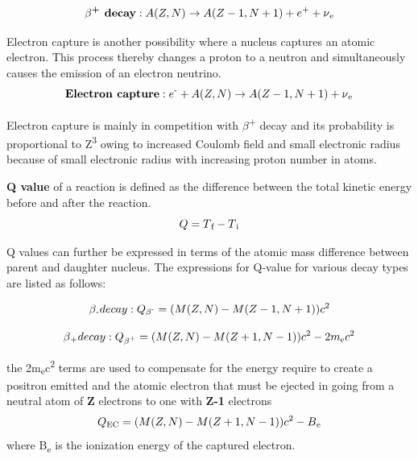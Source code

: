 \begin{equation}
\textbf{$\beta$\textsuperscript{+} decay}: A(Z,N) \to A(Z-1 , N+1) + e\textsuperscript{+} + {\nu}\textsubscript{e}
\end{equation}

Electron capture is another possibility where a nucleus captures an atomic electron. This process thereby changes a proton to a neutron and simultaneously causes the emission of an electron neutrino.
\begin{equation}
\textbf{Electron capture}:  e\textsuperscript{-} + A(Z,N) \to A(Z-1 , N+1) +{\nu}\textsubscript{e}
\end{equation}

Electron capture is mainly in competition with $\beta$\textsuperscript{+} decay and its probability is proportional to Z\textsuperscript{3} owing to increased Coulomb field and small electronic radius because of small electronic radius with increasing proton number in atoms.

\textbf{Q value} of a reaction is defined as the difference between the total kinetic energy before and after the reaction. 
\begin{equation}
Q = T\textsubscript{f} - T\textsubscript{i}
\end{equation}

Q values can further be expressed in terms of the atomic mass difference between parent and daughter nucleus. The expressions for Q-value for various decay types are listed as follows: 

\begin{equation}
\beta\textsubscript{-} decay:
Q\textsubscript{$\beta$\textsuperscript{-}} = (M(Z,N)  - M(Z-1,N+1))c\textsuperscript{2}  
\end{equation}

\begin{equation}
\beta\textsubscript{+} decay:
Q\textsubscript{$\beta$\textsuperscript{+}} = (M(Z,N)  - M(Z+1,N-1))c\textsuperscript{2} - 2m\textsubscript{e}c\textsuperscript{2}
\end{equation}

the 2m\textsubscript{e}c\textsuperscript{2} terms are used to compensate for the energy require to create a positron emitted and the atomic electron that must be ejected in going from a neutral atom of \textbf{Z} electrons to one with \textbf{Z-1} electrons
\begin{equation}
Q\textsubscript{EC} = (M(Z,N)  - M(Z+1,N-1))c\textsuperscript{2}-B\textsubscript{e}
\end{equation}
where B\textsubscript{e} is the ionization energy of the captured electron.


